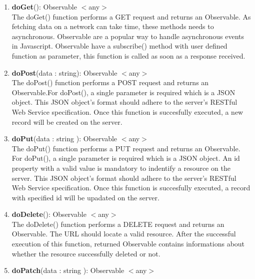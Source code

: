 \begin{enumerate}
\item{
	\textbf{doGet}(): Observable $<$any$>$ \\
	The doGet() function performs a GET request and returns an Observable. As fetching data on a network can take time, these methods needs to asynchronous. Observable are a popular way to handle asynchronous events in Javascript. Observable have a subscribe() method with user defined function as parameter, this function is called as soon as a response received.
}
\item{
	\textbf{doPost}(data  : string): Observable $<$any$>$ \\
		The doPost() function performs a POST request and returns an Observable.For doPost(), a single parameter is required which is a JSON object. This JSON object's format should adhere to the server's RESTful Web Service specification. Once this function is succesfully executed, a new record will be created on the server.
}
\item{
	\textbf{doPut}(data : string ): Observable $<$any$>$ \\
	The doPut() function performs a PUT request and returns an Observable. For doPut(), a single parameter is required which is a JSON object. An id property with a valid value is mandatory to indentify a resource on the server. This JSON object's format should adhere to the server's RESTful Web Service specification. Once this function is succesfully executed, a record with specified id will be upadated on the server.
}
\item{
	\textbf{doDelete}(): Observable $<$any$>$ \\
	The doDelete() function performs a DELETE request and returns an Observable. The URL should locate a valid resource. After the successful execution of this function, returned Observable contains informations about whether the resource successfully deleted or not.
	
}	
\item{
	\textbf{doPatch}(data : string ): Observable $<$any$>$ \\
	
}
\end{enumerate}
